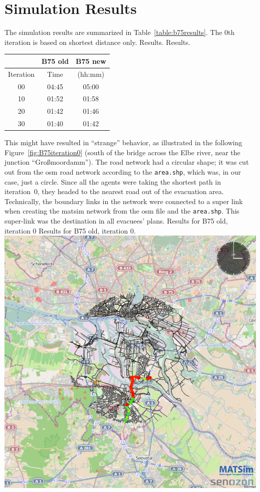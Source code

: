 \section{Simulation Results}
The simulation results are summarized in Table~\ref{table:b75results}. The 0th iteration is based on shortest distance only. 
%
\createtable%
{Results.}%
{Results.}%
{\label{table:b75results}}%
{%
\begin{tabular}{|c|c|c|}
	\hline \rule[-2ex]{0pt}{5.5ex}  & B75 old & B75 new \\ 
	\hline \rule[-2ex]{0pt}{5.5ex}  Iteration & Time &  (hh:mm) \\ 
	\hline \rule[-2ex]{0pt}{5.5ex}  00 & 04:45 &  05:00\\ 
	\hline \rule[-2ex]{0pt}{5.5ex}  10 & 01:52 &  01:58\\ 
	\hline \rule[-2ex]{0pt}{5.5ex}  20 & 01:42 &  01:46\\ 
	\hline \rule[-2ex]{0pt}{5.5ex}  30 & 01:40 &  01:42\\ 
	\hline 
\end{tabular}
}%
{}%
%
This might have resulted in ``strange'' behavior, as illustrated in the following Figure~\ref{fig:B75iteration0} (south of the bridge across the Elbe river, near the junction ``Gro{\ss}moordamm''). The road network had a circular shape; it was cut out from the osm road network according to the \lstinline|area.shp|, which was, in our case, just a circle. Since all the agents were taking the shortest path in iteration~0, they headed to the nearest road out of the evacuation area. Technically, the boundary links in the network were connected to a super link when creating the \gls{matsim} network from the \gls{osm} file and the \lstinline|area.shp|. This super-link was the destination in all evacuees' plans. 
%
\createfigure%
{Results for B75 old, iteration 0}%
{Results for B75 old, iteration 0.}%
{\label{fig:B75iteration0}}%
{\includegraphics[width=0.7\linewidth]{using/figures/B75iteration0}}%
